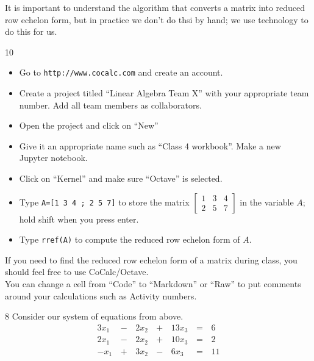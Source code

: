 \begin{applicationActivities}
\begin{remark}
It is important to understand the  algorithm that converts a matrix into reduced row echelon form, but in practice we don't do thsi by hand; we use technology to do this for us.
\end{remark}

\begin{activity}{10}
\begin{itemize}
\item Go to {\tt http://www.cocalc.com} and create an account.
\item Create a project titled ``Linear Algebra Team X'' with your appropriate team number.  Add all team members as collaborators.
\item Open the project and click on ``New''
\item Give it an appropriate name such as ``Class 4 workbook''.  Make a new Jupyter notebook.
\item Click on ``Kernel'' and make sure ``Octave'' is selected.
\item Type {\tt A=[1 3 4 ; 2 5 7]} to store the matrix $\begin{bmatrix} 1 & 3 & 4 \\ 2 & 5 & 7\end{bmatrix}$ in the variable $A$; hold shift when you press enter.
\item Type {\tt rref(A)} to compute the reduced row echelon form of $A$.
\end{itemize}
\end{activity}

\begin{remark}
If you need to find the reduced row echelon form of a matrix during class, you should feel free to use CoCalc/Octave.
\ \\

You can change a cell from ``Code'' to ``Markdown'' or ``Raw'' to put comments around your calculations such as Activity numbers.
\end{remark}

\begin{activity}{8}
Consider our system of equations from above.
 \[
		\begin{alignedat}{4}
   		  3x_1 &\,-\,& 2x_2 &\,+\,& 13x_3 &\,=\,& 6 \\
   		  2x_1 &\,-\,& 2x_2 &\,+\,& 10x_3 &\,=\,& 2 \\
   		  -x_1 &\,+\,& 3x_2 &\,-\,&  6x_3 &\,=\,& 11
   		\end{alignedat}
\]


\end{activity}
\end{applicationActivities}
